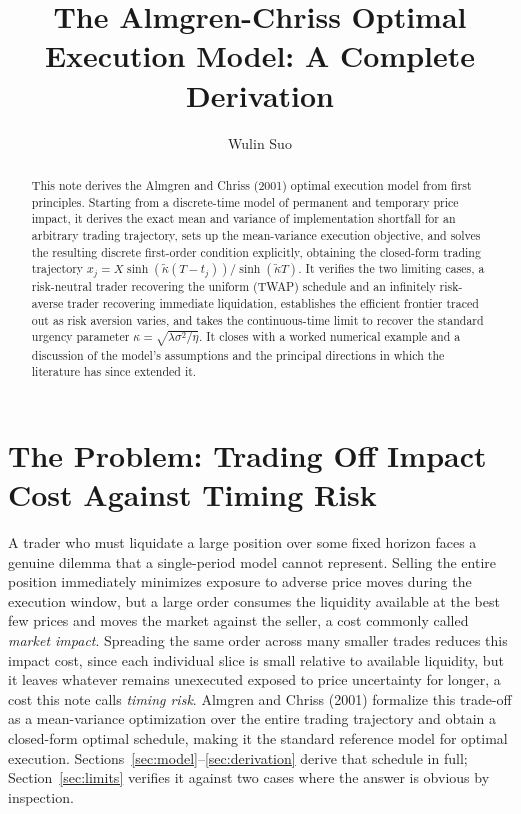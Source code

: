 \documentclass[11pt]{article}
\title{The Almgren-Chriss Optimal Execution Model: A Complete Derivation}
\author{Wulin Suo}
\date{}
\theoremstyle{remark}
\theoremstyle{definition}
\begin{document}
\maketitle

\begin{abstract}
\noindent This note derives the Almgren and Chriss (2001) optimal execution model from first principles. Starting from a discrete-time model of permanent and temporary price impact, it derives the exact mean and variance of implementation shortfall for an arbitrary trading trajectory, sets up the mean-variance execution objective, and solves the resulting discrete first-order condition explicitly, obtaining the closed-form trading trajectory $x_j = X\sinh(\tilde\kappa(T-t_j))/\sinh(\tilde\kappa T)$. It verifies the two limiting cases, a risk-neutral trader recovering the uniform (TWAP) schedule and an infinitely risk-averse trader recovering immediate liquidation, establishes the efficient frontier traced out as risk aversion varies, and takes the continuous-time limit to recover the standard urgency parameter $\kappa=\sqrt{\lambda\sigma^2/\eta}$. It closes with a worked numerical example and a discussion of the model's assumptions and the principal directions in which the literature has since extended it.
\end{abstract}

\section{The Problem: Trading Off Impact Cost Against Timing Risk}
\label{sec:setup}

A trader who must liquidate a large position over some fixed horizon faces a genuine dilemma that a single-period model cannot represent. Selling the entire position immediately minimizes exposure to adverse price moves during the execution window, but a large order consumes the liquidity available at the best few prices and moves the market against the seller, a cost commonly called \emph{market impact}. Spreading the same order across many smaller trades reduces this impact cost, since each individual slice is small relative to available liquidity, but it leaves whatever remains unexecuted exposed to price uncertainty for longer, a cost this note calls \emph{timing risk}. Almgren and Chriss (2001) formalize this trade-off as a mean-variance optimization over the entire trading trajectory and obtain a closed-form optimal schedule, making it the standard reference model for optimal execution. Sections~\ref{sec:model}--\ref{sec:derivation} derive that schedule in full; Section~\ref{sec:limits} verifies it against two cases where the answer is obvious by inspection.
\end{document}
